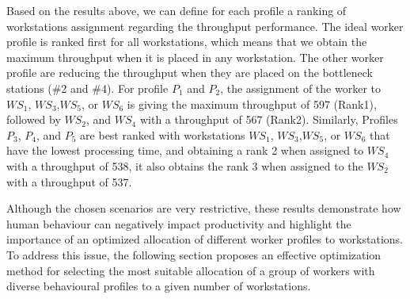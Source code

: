 \documentclass[review,12pt, 3p, times]{elsarticle}
\begin{document}
Based on the results above, we can define for each profile a ranking of workstations assignment regarding the throughput performance. The ideal worker profile is ranked first for all workstations, which means that we obtain the maximum throughput when it is placed in any workstation. The other worker profile are reducing the throughput when they are placed on the bottleneck stations (\#2 and \#4). For profile $P_1$ and $P_2$, the assignment of the worker to $\textit{WS}_1$, $\textit{WS}_3$,$\textit{WS}_5$, or $\textit{WS}_6$ is giving the maximum throughput of 597 (Rank1), followed by  $\textit{WS}_2$, and  $\textit{WS}_4$ with a throughput of 567 (Rank2).  Similarly, Profiles $P_3$, $P_4$, and $P_5$ are best ranked with workstations $\textit{WS}_1$, $\textit{WS}_3$,$\textit{WS}_5$, or $\textit{WS}_6$ that have the lowest processing time, and obtaining a rank 2 when assigned to $\textit{WS}_4$ with a throughput of 538, it also obtains the rank 3 when assigned to the $\textit{WS}_2$ with a throughput of 537.
	
Although the chosen scenarios are very restrictive, these results demonstrate how human behaviour can negatively impact productivity and highlight the importance of an optimized allocation of different worker profiles to workstations. To address this issue, the following section proposes an effective optimization method for selecting the most suitable allocation of a group of workers with diverse behavioural profiles to a given number of workstations.
\end{document}
